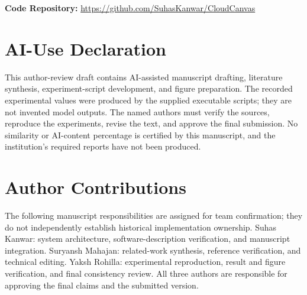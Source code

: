 \documentclass[12pt,a4paper,onecolumn,draftclsnofoot]{IEEEtran}
\newcommand{\CodeRepository}{\url{https://github.com/SuhasKanwar/CloudCanvas}}
\begin{document}
\noindent\textbf{Code Repository:} \CodeRepository










\section*{AI-Use Declaration}
This author-review draft contains AI-assisted manuscript drafting, literature synthesis, experiment-script development, and figure preparation. The recorded experimental values were produced by the supplied executable scripts; they are not invented model outputs. The named authors must verify the sources, reproduce the experiments, revise the text, and approve the final submission. No similarity or AI-content percentage is certified by this manuscript, and the institution's required reports have not been produced.

\section*{Author Contributions}
The following manuscript responsibilities are assigned for team confirmation; they do not independently establish historical implementation ownership. Suhas Kanwar: system architecture, software-description verification, and manuscript integration. Suryansh Mahajan: related-work synthesis, reference verification, and technical editing. Yaksh Rohilla: experimental reproduction, result and figure verification, and final consistency review. All three authors are responsible for approving the final claims and the submitted version.



\end{document}
